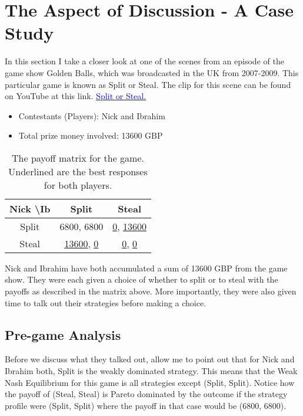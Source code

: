 \documentclass[11pt]{article}
\theoremstyle{definition}
\begin{document}
\section{The Aspect of Discussion - A Case Study}

In this section I take a closer look at one of the scenes from an episode of the game show Golden Balls, which was broadcasted in the UK from 2007-2009. This particular game is known as Split or Steal. The clip for this scene can be found on YouTube at this link. \href{https://www.youtube.com/watch?v=S0qjK3TWZE8}{\textcolor{blue}{\underline{Split or Steal.}}}

\begin{itemize}
\item[] Contestants (Players): Nick and Ibrahim
\item[] Total prize money involved: 13600 GBP
\end{itemize}

\begin{table}[h!]
\centering
\begin{tabular}{|c|c|c|}
\hline
Nick \textbackslash Ib & Split & Steal \\
\hline
Split & 6800, 6800 & \underline{0}, \underline{13600} \\
\hline
Steal & \underline{13600}, \underline{0} & \underline{0}, \underline{0} \\
\hline
\end{tabular}
\caption{The payoff matrix for the game. Underlined are the best responses for both players.}
\label{table:ss}
\end{table}

Nick and Ibrahim have both accumulated a sum of 13600 GBP from the game show. They were each given a choice of whether to split or to steal with the payoffs as described in the matrix above. More importantly, they were also given time to talk out their strategies before making a choice.

\subsection{Pre-game Analysis}
Before we discuss what they talked out, allow me to point out that for Nick and Ibrahim both, Split is the weakly dominated strategy. This means that the Weak Nash Equilibrium for this game is all strategies except (Split, Split). Notice how the payoff of (Steal, Steal) is Pareto dominated by the outcome if the strategy profile were (Split, Split) where the payoff in that case would be (6800, 6800).
\end{document}
